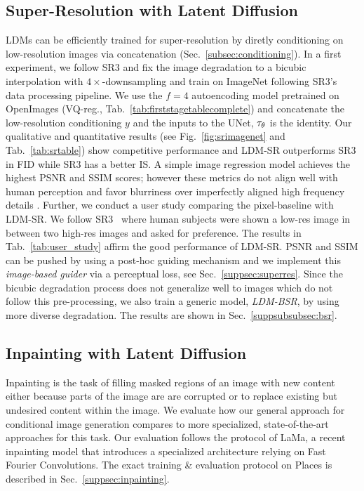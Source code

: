 \documentclass[10pt,twocolumn,letterpaper]{article}
\begin{document}
\subsection{Super-Resolution with Latent Diffusion}
\label{subsec:superres}
%
\vspace{-0.5em}
%
LDMs can be efficiently trained for super-resolution by diretly conditioning on low-resolution images via concatenation (\cf Sec.~\ref{subsec:conditioning}).
In a first experiment, we follow SR3 \cite{DBLP:journals/corr/abs-2104-07636} and fix the image degradation to a bicubic interpolation with $4\times$-downsampling and train on ImageNet following SR3's data processing pipeline. We use the $f=4$ autoencoding model pretrained on OpenImages (VQ-reg., \cf Tab.~\ref{tab:firststagetablecomplete}) and concatenate the low-resolution conditioning $y$ and the inputs to the UNet, \ie $\tau_\theta$ is the identity.
Our qualitative and quantitative results (see Fig.~\ref{fig:srimagenet} and Tab.~\ref{tab:srtable}) show competitive performance and LDM-SR outperforms SR3 in FID while SR3 has a better IS. 
%
A simple image regression model achieves the highest PSNR and SSIM scores; 
however these metrics do not align well with human perception \cite{lpips} and favor blurriness over imperfectly aligned high frequency details \cite{DBLP:journals/corr/abs-2104-07636}. 
Further, we conduct a user study comparing the pixel-baseline with LDM-SR. We follow SR3~\cite{DBLP:journals/corr/abs-2104-07636} where human subjects were shown a low-res image in between two high-res images and asked for preference. The results in Tab.~\ref{tab:user_study} affirm the good performance of LDM-SR. 
%
PSNR and SSIM can be pushed by using a post-hoc guiding mechanism \cite{DBLP:journals/corr/abs-2105-05233} and we implement this \emph{image-based guider} via a perceptual loss, see Sec.~\ref{suppsec:superres}.
%
\srimagenet
%
%
%
%
%
%
%
%
%
%
%
%
%
%
%
\userstudy
Since the bicubic degradation process does not generalize well to images which do not follow this pre-processing, we also train a generic model, \emph{LDM-BSR}, by using more diverse degradation. The results are shown in Sec.~\ref{suppsubsubsec:bsr}.
\srtable
%
%
%
%
%
%
%
%
%
%
%

%
%
%
%
%
%
%
%
%
%
%
%
%
%
%
%

\subsection{Inpainting with Latent Diffusion}
\label{subsec:inpainting}
%
\vspace{-0.5em}
Inpainting is the task of filling masked regions of an image with new content either
because parts of the image are are corrupted or to
replace existing but undesired content within the image. We evaluate how our
general approach for conditional image generation compares to more specialized,
state-of-the-art approaches for this task. Our evaluation follows the protocol
of LaMa\cite{lama}, a recent inpainting model that introduces a specialized
architecture relying on Fast Fourier Convolutions\cite{Chi2020FastFC}. 
The exact training \& evaluation protocol on Places\cite{places} is described in Sec.~\ref{suppsec:inpainting}.
%
%
%
%
%
\end{document}
